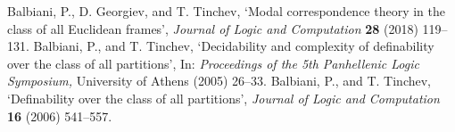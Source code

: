 \documentclass[draft]{article}
\def\KD{\mathbf{KD}}
\def\KB{\mathbf{KB}}
\def\KTB{\mathbf{KTB}}
\begin{document}
\begin{thebibliography}{}
%
%
%
%
%
%
%
%
%
%
%
%
{\sc Balbiani,} P., D. {\sc Georgiev,} and T. {\sc Tinchev,}
`Modal correspondence theory in the class of all Euclidean frames',
\emph{Journal of Logic and Computation}\/ {\bf 28} (2018) 119--131.
%
%
%
%
%
%
%
%
{\sc Balbiani,} P., and T. {\sc Tinchev,}
`Decidability and complexity of definability over the class of all partitions',
In: \emph{Proceedings of the 5th Panhellenic Logic Symposium,}\/
University of Athens (2005) 26--33.
%
%
{\sc Balbiani,} P., and T. {\sc Tinchev,}
`Definability over the class of all partitions',
\emph{Journal of Logic and Computation}\/ {\bf 16} (2006) 541--557.
%
%
%
%

\end{thebibliography}
\end{document}
